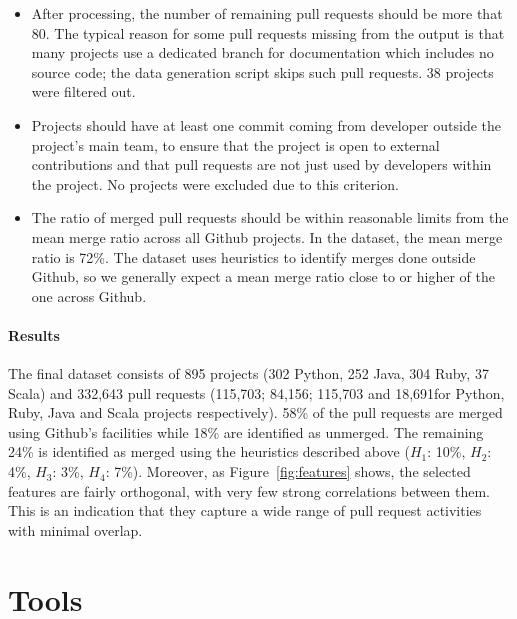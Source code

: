 \documentclass{sig-alternate}
\begin{document}
\begin{itemize}

  \item After processing, the number of remaining pull requests should be more
    that 80. The typical reason for some pull requests missing from the output
    is that many projects use a dedicated branch for documentation which
    includes no source code; the data generation script skips such pull
    requests. 38 projects were filtered out.

  \item Projects should have at least one commit coming from developer outside
    the project's main team, to ensure that the project is open to external
    contributions and that pull requests are not just used by developers within
    the project. No projects were excluded due to this criterion.

  \item The ratio of merged pull requests should be within reasonable limits
    from the mean merge ratio across all Github projects. In the \ghtorrent
    dataset, the mean merge ratio is 72\%. The \pullreqs dataset uses heuristics
    to identify merges done outside Github, so we generally expect a mean merge
    ratio close to or higher of the one across Github.

\end{itemize}

\paragraph*{Results} The final dataset consists of 895 projects (302 Python, 252 Java, 304 Ruby, 37
Scala) and 332,643 pull requests (115,703; 84,156; 115,703 and 18,691for Python,
Ruby, Java and Scala projects respectively). 58\% of the pull requests are
merged using Github's facilities while 18\% are identified as unmerged.
The remaining 24\% is identified as merged using the heuristics described
above ($H_1$: 10\%, $H_2$: 4\%, $H_3$: 3\%, $H_4$: 7\%).
Moreover, as Figure~\ref{fig:features} shows,
the selected features are fairly orthogonal, with very few strong correlations
between them. This is an indication that they capture a wide range of pull
request activities with minimal overlap.

\section{Tools}
\end{document}
